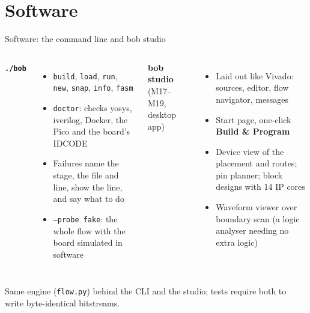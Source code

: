 \documentclass[aspectratio=169,11pt]{beamer}
\newcommand{\src}[1]{{\scriptsize\color{bobmute}#1}}
\begin{document}
\section{Software}
\begin{frame}{Software: the command line and bob studio}
  \begin{columns}[T]
    \textbf{\texttt{./bob}}
    \small
    \begin{itemize}
      \item \texttt{build}, \texttt{load}, \texttt{run}, \texttt{new}, \texttt{snap}, \texttt{info}, \texttt{fasm}
      \item \texttt{doctor}: checks yosys, iverilog, Docker, the Pico and the board's IDCODE
      \item Failures name the stage, the file and line, show the line, and say what to do
      \item \texttt{--probe fake}: the whole flow with the board simulated in software
    \end{itemize}
    \textbf{bob studio} (M17--M19, desktop app)
    \small
    \begin{itemize}
      \item Laid out like Vivado: sources, editor, flow navigator, messages
      \item Start page, one-click \textbf{Build \& Program}
      \item Device view of the placement and routes; pin planner; block designs with 14 IP cores
      \item Waveform viewer over boundary scan (a logic analyser needing no extra logic)
    \end{itemize}
  \end{columns}
  \vspace{2mm}
  \centering
  \src{Same engine (\texttt{flow.py}) behind the CLI and the studio; tests require both to write byte-identical bitstreams.}
\end{frame}

\end{document}
